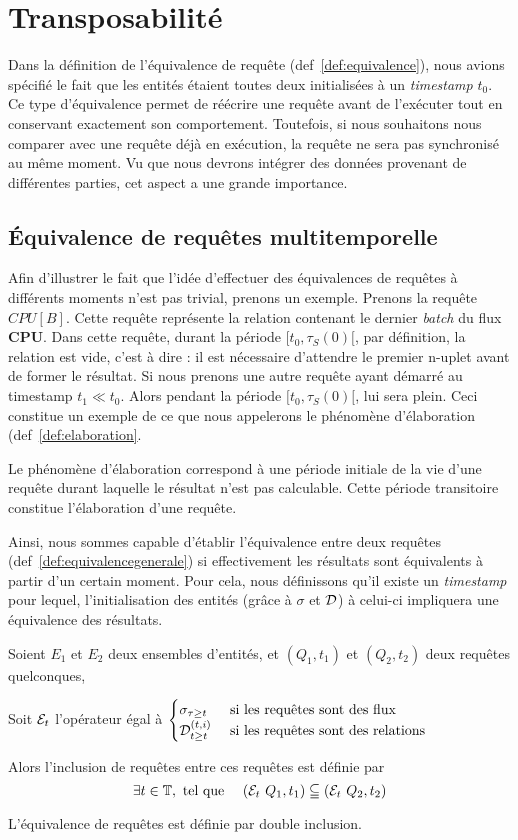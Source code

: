 \section{Transposabilité}
Dans la définition de l'équivalence de requête (def~\ref{def:equivalence}), nous avions spécifié le fait que les entités étaient toutes deux initialisées à un \textit{timestamp} $t_0$. Ce type d'équivalence permet de réécrire une requête avant de l'exécuter tout en conservant exactement son comportement. Toutefois, si nous souhaitons nous comparer avec une requête déjà en exécution, la requête ne sera pas synchronisé au même moment. Vu que nous devrons intégrer des données provenant de différentes parties, cet aspect a une grande importance.
\subsection{Équivalence de requêtes multitemporelle}
Afin d'illustrer le fait que l'idée d'effectuer des équivalences de requêtes à différents moments n'est pas trivial, prenons un exemple. Prenons la requête $CPU[B]$. Cette requête représente la relation contenant le dernier \textit{batch} du flux \textbf{CPU}. Dans cette requête, durant la période $[t_0,\tau_S(0)[$, par définition, la relation est vide, c'est à dire : il est nécessaire d'attendre le premier n-uplet avant de former le résultat. Si nous prenons une autre requête ayant démarré au timestamp $t_1 \ll t_0$. Alors pendant la période $[t_0,\tau_S(0)[$, lui sera plein. Ceci constitue un exemple de ce que nous appelerons le phénomène d'élaboration (def~\ref{def:elaboration}.
\begin{defi}\label{def:elaboration}
    Le phénomène d'élaboration correspond à une période initiale de la vie d'une requête durant laquelle le résultat n'est pas calculable. Cette période transitoire constitue l'élaboration d'une requête.
\end{defi}

Ainsi, nous sommes capable d'établir l'équivalence entre deux requêtes (def~\ref{def:equivalencegenerale}) si effectivement les résultats sont équivalents à partir d'un certain moment. Pour cela, nous définissons qu'il existe un \textit{timestamp} pour lequel, l'initialisation des entités (grâce à $\sigma$ et $\mathcal{D}$) à celui-ci impliquera une équivalence des résultats.
\begin{defi}\label{def:equivalencegenerale}
    Soient $E_1$ et $E_2$ deux ensembles d'entités, et $(Q_1,t_1)$ et $(Q_2,t_2)$ deux requêtes quelconques,

    Soit $\mathcal{E}_t$ l'opérateur égal à $\begin{cases} \sigma_{\tau\geq t} & \textrm{ si les requêtes sont des flux}\\ \mathcal{D}_{t\geq t}^{(t,i)} & \textrm{  si les requêtes sont des relations}\end{cases}$

    Alors l'inclusion de requêtes entre ces requêtes est définie par $$\exists t \in \mathbb{T}, \textrm{ tel que } \quad (\mathcal{E}_t\ Q_1, t_1) \subseteqq (\mathcal{E}_t\  Q_2, t_2)$$

    L'équivalence de requêtes est définie par double inclusion.
\end{defi}


